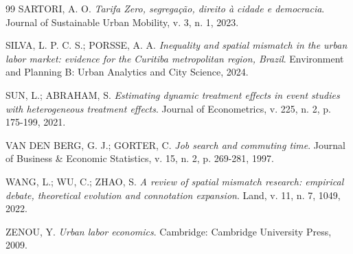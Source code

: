 \documentclass[12pt, a4paper]{article}
\begin{document}
\begin{thebibliography}{99}
SARTORI, A. O. \textit{Tarifa Zero, segregação, direito à cidade e democracia}. Journal of Sustainable Urban Mobility, v. 3, n. 1, 2023.

SILVA, L. P. C. S.; PORSSE, A. A. \textit{Inequality and spatial mismatch in the urban labor market: evidence for the Curitiba metropolitan region, Brazil}. Environment and Planning B: Urban Analytics and City Science, 2024.

SUN, L.; ABRAHAM, S. \textit{Estimating dynamic treatment effects in event studies with heterogeneous treatment effects}. Journal of Econometrics, v. 225, n. 2, p. 175-199, 2021.

VAN DEN BERG, G. J.; GORTER, C. \textit{Job search and commuting time}. Journal of Business \& Economic Statistics, v. 15, n. 2, p. 269-281, 1997.

WANG, L.; WU, C.; ZHAO, S. \textit{A review of spatial mismatch research: empirical debate, theoretical evolution and connotation expansion}. Land, v. 11, n. 7, 1049, 2022.

ZENOU, Y. \textit{Urban labor economics}. Cambridge: Cambridge University Press, 2009.

\end{thebibliography}

\newpage

\section*{}
\end{document}
